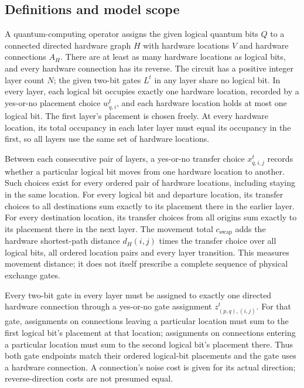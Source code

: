 \documentclass[10pt]{article}
\begin{document}
\subsection*{Definitions and model scope}
A quantum-computing operator assigns the given logical quantum bits $Q$ to a connected directed hardware graph $H$ with hardware locations $V$ and hardware connections $A_H$. There are at least as many hardware locations as logical bits, and every hardware connection has its reverse. The circuit has a positive integer layer count $N$; the given two-bit gates $L^t$ in any layer share no logical bit. In every layer, each logical bit occupies exactly one hardware location, recorded by a yes-or-no placement choice $w_{q,i}^t$, and each hardware location holds at most one logical bit. The first layer's placement is chosen freely. At every hardware location, its total occupancy in each later layer must equal its occupancy in the first, so all layers use the same set of hardware locations.

Between each consecutive pair of layers, a yes-or-no transfer choice $x_{q,i,j}^t$ records whether a particular logical bit moves from one hardware location to another. Such choices exist for every ordered pair of hardware locations, including staying in the same location. For every logical bit and departure location, its transfer choices to all destinations sum exactly to its placement there in the earlier layer. For every destination location, its transfer choices from all origins sum exactly to its placement there in the next layer. The movement total $c_{\mathrm{swap}}$ adds the hardware shortest-path distance $d_H(i,j)$ times the transfer choice over all logical bits, all ordered location pairs and every layer transition. This measures movement distance; it does not itself prescribe a complete sequence of physical exchange gates.

Every two-bit gate in every layer must be assigned to exactly one directed hardware connection through a yes-or-no gate assignment $z_{(p,q),(i,j)}^t$. For that gate, assignments on connections leaving a particular location must sum to the first logical bit's placement at that location; assignments on connections entering a particular location must sum to the second logical bit's placement there. Thus both gate endpoints match their ordered logical-bit placements and the gate uses a hardware connection. A connection's noise cost is given for its actual direction; reverse-direction costs are not presumed equal.
\end{document}
